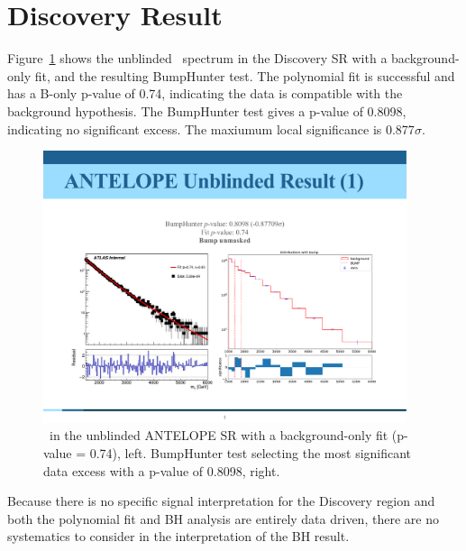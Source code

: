 \section{Discovery Result}
\label{sec:results_svj}
Figure~\ref{fig:unblinded_antelope_masked} shows the unblinded \mt~spectrum in the Discovery SR with a background-only fit, and the resulting BumpHunter test.
The polynomial fit is successful and has a B-only p-value of 0.74, indicating the data is compatible with the background hypothesis. 
The BumpHunter test gives a p-value of 0.8098, indicating no significant excess.
The maxiumum local significance is 0.877$\sigma$. 
\begin{figure}[!htbp]
\centering
   \includegraphics[width=0.95\textwidth]{figures/results/unblinded_antelope_unmasked}
    \caption{\mt~in the unblinded ANTELOPE SR with a background-only fit (p-value = 0.74), left. BumpHunter test selecting the most significant data excess with a p-value of 0.8098, right.
    \label{fig:unblinded_antelope_masked}}
\end{figure}

Because there is no specific signal interpretation for the Discovery region and both the polynomial fit and BH analysis are entirely data driven, there are no systematics to consider in the interpretation of the BH result.

